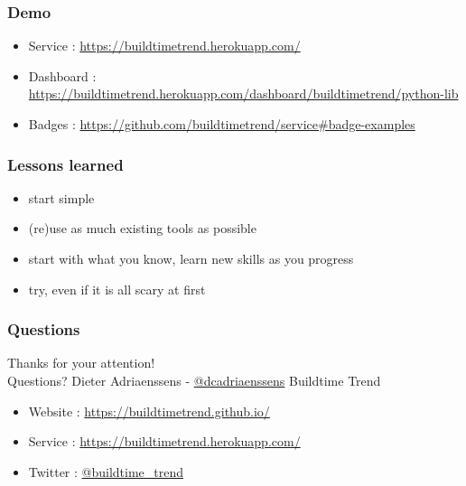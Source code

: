 \documentclass[14pt]{beamer}
\begin{document}
  \begin{frame}
    \frametitle{Demo}
    \begin{itemize}
      \item Service : \href{https://buildtimetrend.herokuapp.com/}{\small{https://buildtimetrend.herokuapp.com/}}
      \item Dashboard : \href{https://buildtimetrend.herokuapp.com/dashboard/buildtimetrend/python-lib/index.html}{\small{https://buildtimetrend.herokuapp.com/dashboard/buildtimetrend/python-lib}}
      \item Badges : \href{https://github.com/buildtimetrend/service\#badge-examples}{\small{https://github.com/buildtimetrend/service\#badge-examples}}
    \end{itemize}
  \end{frame}

  \begin{frame}
    \frametitle{Lessons learned}
    \begin{itemize}
      \item start simple
      \item (re)use as much existing tools as possible
      \item start with what you know, learn new skills as you progress
      \item try, even if it is all scary at first
    \end{itemize}
  \end{frame}
  \begin{frame}
   \frametitle{Questions}
    Thanks for your attention!\\
    Questions?
    \vfill
    Dieter Adriaenssens - \href{https://twitter.com/dcadriaenssens}{\small{@dcadriaenssens}}
    \vfill
    Buildtime Trend
    \begin{itemize}
      \item Website : \href{https://buildtimetrend.github.io/}{\small{https://buildtimetrend.github.io/}}
      \item Service : \href{https://buildtimetrend.herokuapp.com/}{\small{https://buildtimetrend.herokuapp.com/}}
      \item Twitter : \href{https://twitter.com/buildtime_trend}{\small{@buildtime\_trend}}
    \end{itemize}
  \end{frame}
\end{document}
